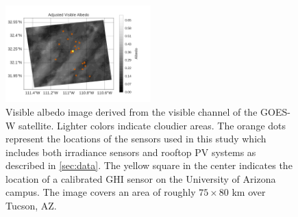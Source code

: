 \begin{figure}[h]
\centering
\includegraphics[width=0.5\textwidth]{figs/pa.pdf}
\caption{Visible albedo image derived from the visible channel of the
  GOES-W satellite. Lighter colors indicate cloudier areas. The orange
  dots represent the locations of the sensors used in this study which
  includes both irradiance sensors and rooftop PV systems as described
  in \cref{sec:data}. The yellow square in the center indicates the
  location of a calibrated GHI sensor on the University of Arizona
  campus. The image covers an area of roughly $75 \times 80$ km over
  Tucson, AZ.}
\label{fig:vis}
\end{figure}


